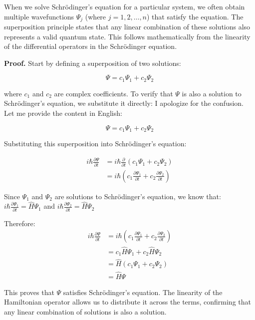 \documentclass[italian]{HKNdocument}
\begin{document}
When we solve Schrödinger's equation for a particular system, we often obtain multiple wavefunctions $\Psi_{j}$ (where $j=1,2, \ldots, n$) that satisfy the equation. The superposition principle states that any linear combination of these solutions also represents a valid quantum state. This follows mathematically from the linearity of the differential operators in the Schrödinger equation.

\textbf{Proof.} Start by defining a superposition of two solutions:

\begin{equation*}
\Psi=c_{1} \Psi_{1}+c_{2} \Psi_{2} \tag{1.19}
\end{equation*}

where $c_1$ and $c_2$ are complex coefficients. To verify that $\Psi$ is also a solution to Schrödinger's equation, we substitute it directly:
I apologize for the confusion. Let me provide the content in English:


\begin{equation*}
\Psi=c_{1} \Psi_{1}+c_{2} \Psi_{2} \tag{1.19}
\end{equation*}

Substituting this superposition into Schrödinger's equation:

\begin{align*}
i \hbar \frac{\partial \Psi}{\partial t} &= i \hbar \frac{\partial}{\partial t}\left(c_{1} \Psi_{1}+c_{2} \Psi_{2}\right) \\
&= i \hbar\left(c_{1} \frac{\partial \Psi_{1}}{\partial t}+c_{2} \frac{\partial \Psi_{2}}{\partial t}\right) \tag{1.20}
\end{align*}

Since $\Psi_1$ and $\Psi_2$ are solutions to Schrödinger's equation, we know that:
$i \hbar \frac{\partial \Psi_1}{\partial t} = \hat{H}\Psi_1$ and $i \hbar \frac{\partial \Psi_2}{\partial t} = \hat{H}\Psi_2$

Therefore:
\begin{align*}
i \hbar \frac{\partial \Psi}{\partial t} &= i \hbar\left(c_{1} \frac{\partial \Psi_{1}}{\partial t}+c_{2} \frac{\partial \Psi_{2}}{\partial t}\right) \\
&= c_{1} \hat{H} \Psi_{1}+c_{2} \hat{H} \Psi_{2} \\
&= \hat{H}\left(c_{1} \Psi_{1}+c_{2} \Psi_{2}\right) \\
&= \hat{H} \Psi
\end{align*}

This proves that $\Psi$ satisfies Schrödinger's equation. The linearity of the Hamiltonian operator allows us to distribute it across the terms, confirming that any linear combination of solutions is also a solution.
\end{document}
